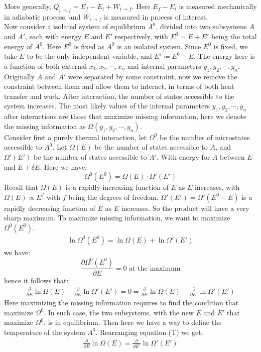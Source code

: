 \documentclass[11pt]{article}
\theoremstyle{break}
\theoremstyle{break}
\begin{document}
\hfill\break
More generally, $Q_{i\to f} = E_f - E_i + W_{i \to f}$. Here $E_f - E_i$ is measured mechanically in adiabatic process, and $W_{i \to f}$ is measured in process of interest.\\


Now consider a isolated system of equilibrium $A^0$, divided into two subsystems $A$ and $A'$, each with energy $E$ and $E'$ respectively, with $E^0 = E+E'$ being the total energy of $A^0$. Here $E^0$ is fixed as $A^0$ is an isolated system. Since $E^0$ is fixed, we take $E$ to be the only independent variable, and $E' \coloneqq E^0 - E$. The energy here is a function of both external $x_1,x_2,\cdots, x_n$ and internal parameters $y_1,y_2,\cdots, y_n$. Originally $A$ and $A'$ were separated by some constraint, now we remove the constraint between them and allow them to interact, in terms of both heat transfer and work. After interaction, the number of states accessible to the system increases. The most likely values of the internal parameters $y_1,y_2,\cdots,y_n$ after interactions are those that maximize missing information, here we denote the missing information as $\Omega(y_1,y_2,\cdots, y_n)$.\\

Consider first a purely thermal interaction, let $\Omega^0$ be the number of microstates accessible to $A^0$. Let $\Omega(E)$ be the number of states accessible to $A$, and $\Omega'(E')$ be the number of states accessible to $A'$. With energy for $A$ between $E$ and $E+\delta E$.
Here we have:
$$\Omega^0(E^0) = \Omega(E) \cdot \Omega' (E')$$
Recall that $\Omega(E)$ is a rapidly increasing function of $E$ as $E$ increases, with $\Omega(E) \propto E^f$ with $f$ being the degrees of freedom. $\Omega'(E') = \Omega'(E^0-E)$ is a rapidly  decreasing function of $E$ as $E $ increases. So the product will have a very sharp maximum. To maximize missing information, we want to maximize $\Omega^0(E^0)$. 
\begin{align*}
 \ln \Omega^0(E^0) = \ln \Omega(E) + \ln \Omega' (E')
\end{align*}
we have:
$$\frac{\partial \Omega^0(E^0)}{\partial E} = 0 \text{ at the maximum}$$
hence it follows that:
\begin{align*}
\frac{\partial }{\partial E}\ln \Omega(E) + \frac{\partial }{\partial E}\ln \Omega'(E') = 0 = \frac{\partial}{\partial E} \ln \Omega(E) - \frac{\partial }{\partial E'}\ln \Omega'(E') \tag{T}
\end{align*}
Here maximizing the missing information requires to find the condition that maximize $\Omega^0$. In such case, the two subsystems, with the new $E$ and $E'$ that maximize $\Omega^0$, is in equilibrium. Then here we have a way to define the temperature of the system $A^0$.
Rearranging equation (T) we get:
\begin{align*}
\frac{\partial }{\partial E}\ln \Omega(E) = \frac{\partial }{\partial E'}\ln \Omega'(E')
\end{align*}
\end{document}
